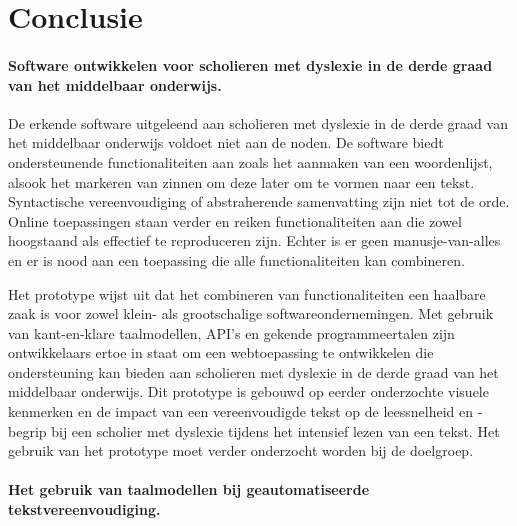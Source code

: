 
\chapter{Conclusie}%
\label{ch:conclusie}


\subsubsection{Software ontwikkelen voor scholieren met dyslexie in de derde graad van het middelbaar onderwijs.}

De erkende software uitgeleend aan scholieren met dyslexie in de derde graad van het middelbaar onderwijs voldoet niet aan de noden. De software biedt ondersteunende functionaliteiten aan zoals het aanmaken van een woordenlijst, alsook het markeren van zinnen om deze later om te vormen naar een tekst. Syntactische vereenvoudiging of abstraherende samenvatting zijn niet tot de orde. Online toepassingen staan verder en reiken functionaliteiten aan die zowel hoogstaand als effectief te reproduceren zijn. Echter is er geen manusje-van-alles en er is nood aan een toepassing die alle functionaliteiten kan combineren. 

Het prototype wijst uit dat het combineren van functionaliteiten een haalbare zaak is voor zowel klein- als grootschalige softwareondernemingen. Met gebruik van kant-en-klare taalmodellen, API's en gekende programmeertalen zijn ontwikkelaars ertoe in staat om een webtoepassing te ontwikkelen die ondersteuning kan bieden aan scholieren met dyslexie in de derde graad van het middelbaar onderwijs. Dit prototype is gebouwd op eerder onderzochte visuele kenmerken en de impact van een vereenvoudigde tekst op de leessnelheid en -begrip bij een scholier met dyslexie tijdens het intensief lezen van een tekst. Het gebruik van het prototype moet verder onderzocht worden bij de doelgroep. 

\subsubsection{Het gebruik van taalmodellen bij geautomatiseerde tekstvereenvoudiging.}

